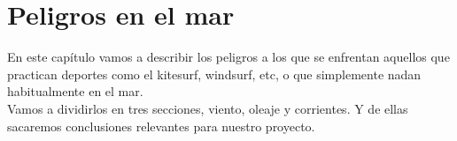 \chapter{Peligros en el mar}

En este capítulo vamos a describir los peligros a los que se enfrentan aquellos que practican deportes como el kitesurf, windsurf, etc, o que simplemente nadan habitualmente en el mar.
\\
Vamos a dividirlos en tres secciones, viento, oleaje y corrientes. Y de ellas sacaremos conclusiones relevantes para nuestro proyecto.




